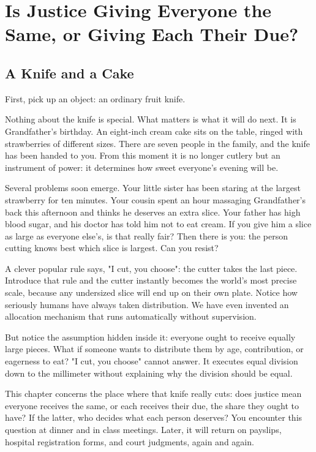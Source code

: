 \chapter[Justice: Equality or Due Shares?]{Is Justice Giving Everyone the Same, or Giving Each Their Due?}
\section{A Knife and a Cake}
First, pick up an object: an ordinary fruit knife.

Nothing about the knife is special. What matters is what it will do next. It is Grandfather's birthday. An eight-inch cream cake sits on the table, ringed with strawberries of different sizes. There are seven people in the family, and the knife has been handed to you. From this moment it is no longer cutlery but an instrument of power: it determines how sweet everyone's evening will be.

Several problems soon emerge. Your little sister has been staring at the largest strawberry for ten minutes. Your cousin spent an hour massaging Grandfather's back this afternoon and thinks he deserves an extra slice. Your father has high blood sugar, and his doctor has told him not to eat cream. If you give him a slice as large as everyone else's, is that really fair? Then there is you: the person cutting knows best which slice is largest. Can you resist?

A clever popular rule says, "I cut, you choose": the cutter takes the last piece. Introduce that rule and the cutter instantly becomes the world's most precise scale, because any undersized slice will end up on their own plate. Notice how seriously humans have always taken distribution. We have even invented an allocation mechanism that runs automatically without supervision.

But notice the assumption hidden inside it: everyone ought to receive equally large pieces. What if someone wants to distribute them by age, contribution, or eagerness to eat? "I cut, you choose" cannot answer. It executes equal division down to the millimeter without explaining why the division should be equal.

This chapter concerns the place where that knife really cuts: does justice mean everyone receives the same, or each receives their due, the share they ought to have? If the latter, who decides what each person deserves? You encounter this question at dinner and in class meetings. Later, it will return on payslips, hospital registration forms, and court judgments, again and again.

